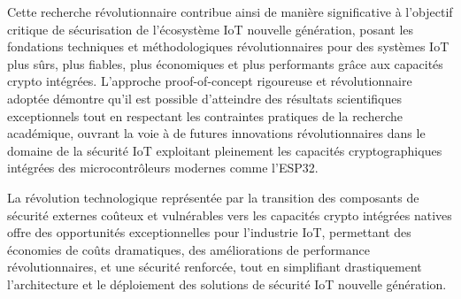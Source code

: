 Cette recherche révolutionnaire contribue ainsi de manière significative à l'objectif critique de sécurisation de l'écosystème IoT nouvelle génération, posant les fondations techniques et méthodologiques révolutionnaires pour des systèmes IoT plus sûrs, plus fiables, plus économiques et plus performants grâce aux capacités crypto intégrées. L'approche proof-of-concept rigoureuse et révolutionnaire adoptée démontre qu'il est possible d'atteindre des résultats scientifiques exceptionnels tout en respectant les contraintes pratiques de la recherche académique, ouvrant la voie à de futures innovations révolutionnaires dans le domaine de la sécurité IoT exploitant pleinement les capacités cryptographiques intégrées des microcontrôleurs modernes comme l'ESP32.

La révolution technologique représentée par la transition des composants de sécurité externes coûteux et vulnérables vers les capacités crypto intégrées natives offre des opportunités exceptionnelles pour l'industrie IoT, permettant des économies de coûts dramatiques, des améliorations de performance révolutionnaires, et une sécurité renforcée, tout en simplifiant drastiquement l'architecture et le déploiement des solutions de sécurité IoT nouvelle génération.